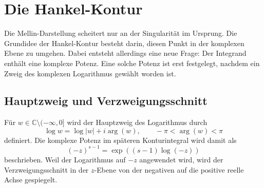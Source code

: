 %
%
%
%

\section{Die Hankel-Kontur
\label{hankel:section:hankel}}

Die Mellin-Darstellung scheitert nur an der Singularität im Ursprung. 
%
Die Grundidee der Hankel-Kontur besteht darin, diesen Punkt in der komplexen Ebene zu umgehen. 
Dabei entsteht allerdings eine neue Frage: Der Integrand enthält eine komplexe Potenz.
Eine solche Potenz ist erst festgelegt, nachdem ein Zweig des komplexen Logarithmus gewählt worden ist.

\subsection{Hauptzweig und Verzweigungsschnitt}

Für $w\in\mathbb C\setminus(-\infty,0]$ wird der Hauptzweig des Logarithmus durch
\begin{equation}
\log w
=
\log|w|+i\operatorname{arg}(w),
\qquad
-\pi<\operatorname{arg}(w)<\pi
\label{hankel:eq:hauptzweig-log}
\end{equation}
definiert. 
Die komplexe Potenz im späteren Konturintegral wird damit als
\begin{equation}
(-z)^{s-1}
=
\exp((s-1)\log(-z))
\label{hankel:eq:minus-z-potenz}
\end{equation}
beschrieben. 
Weil der Logarithmus auf $-z$ angewendet wird, wird der
Verzweigungsschnitt in der $z$-Ebene von der negativen auf die positive reelle Achse gespiegelt.

